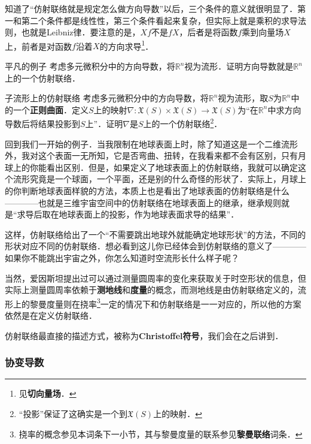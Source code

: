 知道了“仿射联络就是规定怎么做方向导数”以后，三个条件的意义就很明显了．第一和第二个条件都是线性性，第三个条件看起来复杂，但实际上就是乘积的求导法则，也就是Leibniz律．要注意的是，$Xf$不是$fX$，后者是将函数$f$乘到向量场$X$上，前者是对函数$f$沿着$X$的方向求导\footnote{见\textbf{切向量场}．}．


\begin{exercise}{平凡的例子}
考虑多元微积分中的方向导数，将$\mathbb{R}^n$视为流形．证明方向导数就是$\mathbb{R}^n$上的一个仿射联络．
\end{exercise}

\begin{exercise}{子流形上的仿射联络}
考虑多元微积分中的方向导数，将$\mathbb{R}^n$视为流形，取$S$为$\mathbb{R}^n$中的一个\textbf{正则曲面}．定义$S$上的映射$\nabla:\mathfrak{X}(S)\times\mathfrak{X}(S)\to\mathfrak{X}(S)$为“在$\mathbb{R}^n$中求方向导数后将结果投影到$S$上”．证明$\nabla$是$S$上的一个仿射联络\footnote{“投影”保证了这确实是一个到$\mathfrak{X}(S)$上的映射．}．
\end{exercise}

回到我们一开始的例子．当我限制在地球表面上时，除了知道这是一个二维流形外，我对这个表面一无所知，它是否弯曲、扭转，在我看来都不会有区别，只有月球上的你能看出区别．但是，如果定义了地球表面上的仿射联络，我就可以确定这个流形究竟是一个球面，一个平面，还是别的什么奇怪的形状了．实际上，月球上的你判断地球表面样貌的方法，本质上也是看出了地球表面的仿射联络是什么————也就是三维宇宙空间中的仿射联络在地球表面上的继承，继承规则就是“求导后取在地球表面上的投影，作为地球表面求导的结果”．

这样，仿射联络给出了一个“不需要跳出地球外就能确定地球形状”的方法，不同的形状对应不同的仿射联络．想必看到这儿你已经体会到仿射联络的意义了————如果你不能跳出宇宙之外，你怎么知道时空流形长什么样子呢？

当然，爱因斯坦提出过可以通过测量圆周率的变化来获取关于时空形状的信息，但实际上测量圆周率依赖于\textbf{测地线}和\textbf{度量}的概念，而测地线是由仿射联络定义的，流形上的黎曼度量则在挠率\footnote{挠率的概念参见本词条下一小节，其与黎曼度量的联系参见\textbf{黎曼联络}词条．}一定的情况下和仿射联络是一一对应的，所以他的方案依然是在定义仿射联络．

仿射联络最直接的描述方式，被称为\textbf{Christoffel符号}，我们会在之后讲到．

\subsubsection{协变导数}

